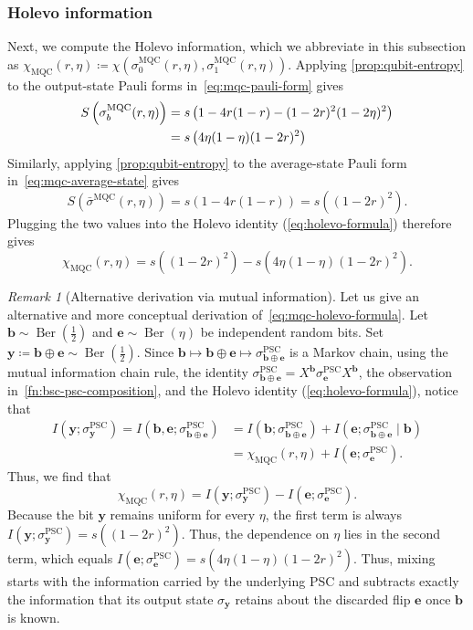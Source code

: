 \documentclass[11pt]{article}
\theoremstyle{remark}
\newtheorem{remark}{Remark}[section]
\newcommand{\Ber}{\operatorname{Ber}}
\newcommand{\bb}{\mathbf{b}}
\newcommand{\be}{\mathbf{e}}
\newcommand{\by}{\mathbf{y}}
\newcommand{\PSC}{\mathrm{PSC}}
\newcommand{\MQC}{\mathrm{MQC}}
\begin{document}
\subsubsection{Holevo information}
\label{subsubsec:mqc-holevo}

Next, we compute the Holevo information, which we abbreviate in this subsection as $\chi_{\MQC}(r,\eta) \coloneqq \chi(\sigma_0^{\MQC}(r,\eta),\sigma_1^{\MQC}(r,\eta))$. Applying \cref{prop:qubit-entropy} to the output-state Pauli forms in~\eqref{eq:mqc-pauli-form} gives
\begin{align}
S\left(\sigma_b^{\MQC}(r,\eta)\right) &= s\left(1-4r(1-r)-(1-2r)^2(1-2\eta)^2\right) \notag \\
&= s\left(4\eta(1-\eta)(1-2r)^2\right) \label{eq:mqc-output-state-holevo}
\end{align}
Similarly, applying \cref{prop:qubit-entropy} to the average-state Pauli form in~\eqref{eq:mqc-average-state} gives
\begin{equation*}
S\left(\bar{\sigma}^{\MQC}(r,\eta)\right) = s\left(1-4r(1-r)\right) = s\left((1-2r)^2\right).
\end{equation*}
Plugging the two values into the Holevo identity (\cref{eq:holevo-formula}) therefore gives
\begin{equation}
\label{eq:mqc-holevo-formula}
\chi_{\MQC}(r,\eta) = s\left((1-2r)^2\right)-s\left(4\eta(1-\eta)(1-2r)^2\right).
\end{equation}

\begin{remark}[Alternative derivation via mutual information]
\label{rem:mqc-mutual-information}
Let us give an alternative and more conceptual derivation of~\cref{eq:mqc-holevo-formula}. Let $\bb \sim \Ber(\frac{1}{2})$ and $\be \sim \Ber(\eta)$ be independent random bits. Set $\by \coloneqq \bb \oplus \be \sim \Ber(\frac{1}{2})$. Since $\bb \longmapsto \bb \oplus \be \longmapsto \sigma_{\bb \oplus \be}^{\PSC}$ is a Markov chain, using the mutual information chain rule, the identity $\sigma_{\bb \oplus \be}^{\PSC} = X^\bb\sigma_{\be}^{\PSC}X^\bb$, the observation in~\cref{fn:bsc-psc-composition}, and the Holevo identity (\cref{eq:holevo-formula}), notice that
\begin{align*}
I(\by;\sigma_\by^{\PSC}) = I(\bb,\be;\sigma_{\bb \oplus \be}^{\PSC})
&= I(\bb;\sigma_{\bb \oplus \be}^{\PSC}) + I(\be;\sigma_{\bb \oplus \be}^{\PSC} \mid \bb) \\
&= \chi_{\MQC}(r,\eta) + I(\be;\sigma_\be^{\PSC}).
\end{align*}
Thus, we find that
\begin{equation*}
\chi_{\MQC}(r,\eta) = I(\by;\sigma_{\by}^{\PSC}) - I(\be;\sigma_\be^{\PSC}).
\end{equation*}
Because the bit $\by$ remains uniform for every $\eta$, the first term is always $I(\by;\sigma_{\by}^{\PSC}) = s((1-2r)^2)$. Thus, the dependence on $\eta$ lies in the second term, which equals $I(\be;\sigma_\be^{\PSC}) = s(4\eta(1-\eta)(1-2r)^2)$. Thus, mixing starts with the information carried by the underlying PSC and subtracts exactly the information that its output state $\sigma_\by$ retains about the discarded flip $\be$ once $\bb$ is known.
\end{remark}
\end{document}
